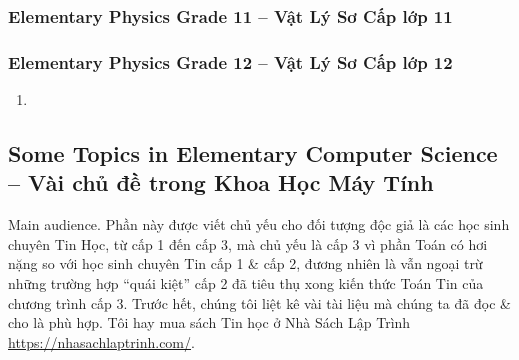 \documentclass[12pt,oneside]{book}
\begin{document}
\subsubsection{Elementary Physics Grade 11 -- Vật Lý Sơ Cấp lớp 11}

\subsubsection{Elementary Physics Grade 12 -- Vật Lý Sơ Cấp lớp 12}

\begin{enumerate}
	\item 
\end{enumerate}


\subsection{Some Topics in Elementary Computer Science -- Vài chủ đề trong Khoa Học Máy Tính}
\label{sect: eCS}
{\sf Main audience.} Phần này được viết chủ yếu cho đối tượng độc giả là các học sinh chuyên Tin Học, từ cấp 1 đến cấp 3, mà chủ yếu là cấp 3 vì phần Toán có hơi nặng so với học sinh chuyên Tin cấp 1 \& cấp 2, đương nhiên là vẫn ngoại trừ những trường hợp ``quái kiệt'' cấp 2 đã tiêu thụ xong kiến thức Toán Tin của chương trình cấp 3. Trước hết, chúng tôi liệt kê vài tài liệu mà chúng ta đã đọc \& cho là phù hợp. Tôi hay mua sách Tin học ở Nhà Sách Lập Trình \url{https://nhasachlaptrinh.com/}.
\end{document}
